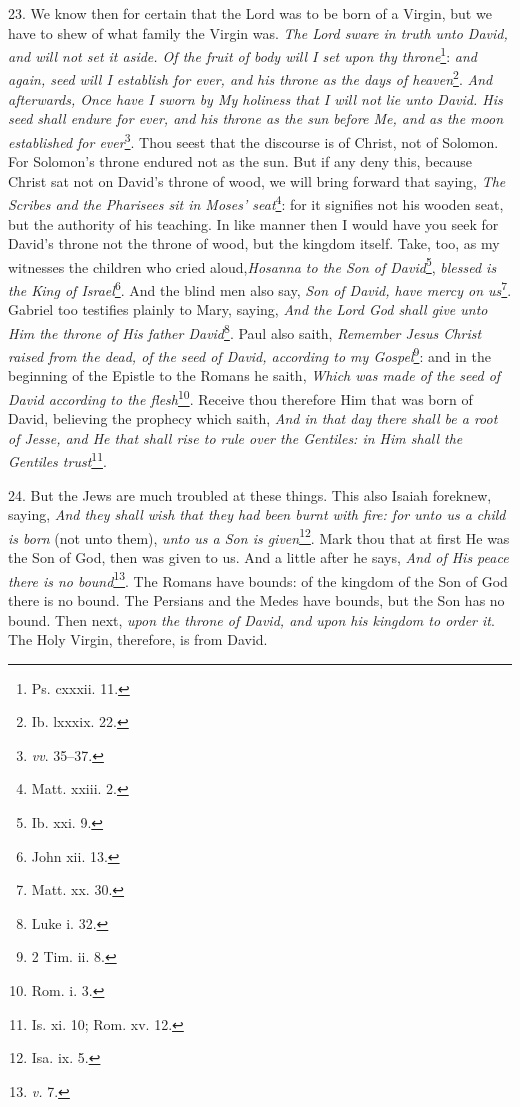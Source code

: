 23. We know then for certain that the Lord was to be born of a Virgin, but we have to shew of what family the Virgin was. \emph{The Lord sware in truth unto David, and will not set it aside. Of the fruit of body will I set upon thy throne}\footnote{Ps. cxxxii. 11.}: \emph{ and again, seed will I establish for ever, and his throne as the days of heaven}\footnote{Ib. lxxxix. 22.}. \emph{ And afterwards, Once have I sworn by My holiness that I will not lie unto David. His seed shall endure for ever, and his throne as the sun before Me, and as the moon established for ever}\footnote{\emph{vv}. 35–37.}. Thou seest that the discourse is of Christ, not of Solomon. For Solomon’s throne endured not as the sun. But if any deny this, because Christ sat not on David’s throne of wood, we will bring forward that saying, \emph{The Scribes and the Pharisees sit in Moses’ seat}\footnote{Matt. xxiii. 2.}: for it signifies not his wooden seat, but the authority of his teaching. In like manner then I would have you seek for David’s throne not the throne of wood, but the kingdom itself. Take, too, as my witnesses the children who cried aloud,\emph{Hosanna to the Son of David}\footnote{Ib. xxi. 9.}, \emph{blessed is the King of Israel}\footnote{John xii. 13.}. And the blind men also say, \emph{Son of David, have mercy on us}\footnote{Matt. xx. 30.}. Gabriel too testifies plainly to Mary, saying, \emph{And the Lord God shall give unto Him the throne of His father David}\footnote{Luke i. 32.}. Paul also saith, \emph{Remember Jesus Christ raised from the dead, of the seed of David, according to my Gospel}\footnote{2 Tim. ii. 8.}: and in the beginning of the Epistle to the Romans he saith, \emph{Which was made of the seed of David according to the flesh}\footnote{Rom. i. 3.}. Receive thou therefore Him that was born of David, believing the prophecy which saith, \emph{And in that day there shall be a root of Jesse, and He that shall rise to rule over the Gentiles: in Him shall the Gentiles trust}\footnote{Is. xi. 10; Rom. xv. 12.}.

24. But the Jews are much troubled at these things. This also Isaiah foreknew, saying, \emph{And they shall wish that they had been burnt with fire: for unto us a child is born} (not unto them), \emph{unto us a Son is given}\footnote{Isa. ix. 5.}. Mark thou that at first He was the Son of God, then was given to us. And a little after he says, \emph{And of His peace there is no bound}\footnote{\emph{v.} 7.}. The Romans have bounds: of the kingdom of the Son of God there is no bound. The Persians and the Medes have bounds, but the Son has no bound. Then next, \emph{upon the throne of David, and upon his kingdom to order it}. The Holy Virgin, therefore, is from David.

